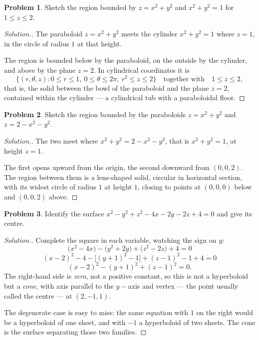 \documentclass[11pt,a4paper]{article}
\theoremstyle{definition}
\newtheorem{problemx}{Problem}[subsection]
\newenvironment{problem}{\begin{problemx}}{\end{problemx}}
\newenvironment{solution}
  {\renewcommand{\qedsymbol}{}\begin{proof}[\textit{Solution}.]}
  {\end{proof}}
\begin{document}
\begin{problem}
Sketch the region bounded by $z = x^2+y^2$ and $x^2+y^2 = 1$ for
$1\leq z\leq 2$.
\end{problem}
\begin{solution}
The paraboloid $z = x^2+y^2$ meets the cylinder $x^2+y^2 = 1$ where $z=1$, in
the circle of radius $1$ at that height.

The region is bounded below by the paraboloid, on the outside by the cylinder,
and above by the plane $z=2$. In cylindrical coordinates it is
$$\big\{(r,\theta,z): 0\leq r\leq 1,\ 0\leq\theta\leq 2\pi,\ r^2\leq z\leq 2\big\}
\quad\text{together with}\quad 1\leq z\leq 2 ,$$
that is, the solid between the bowl of the paraboloid and the plane $z=2$,
contained within the cylinder --- a cylindrical tub with a paraboloidal floor.
\end{solution}

\begin{problem}
Sketch the region bounded by the paraboloids $z = x^2+y^2$ and
$z = 2-x^2-y^2$.
\end{problem}
\begin{solution}
The two meet where $x^2+y^2 = 2-x^2-y^2$, that is $x^2+y^2 = 1$, at height
$z = 1$.

The first opens upward from the origin, the second downward from $(0,0,2)$. The
region between them is a lens-shaped solid, circular in horizontal section, with
its widest circle of radius $1$ at height $1$, closing to points at $(0,0,0)$
below and $(0,0,2)$ above.
\end{solution}

\begin{problem}
Identify the surface $x^2-y^2+z^2-4x-2y-2z+4 = 0$ and give its centre.
\end{problem}
\begin{solution}
Complete the square in each variable, watching the sign on $y$:
$$\big(x^2-4x\big) - \big(y^2+2y\big) + \big(z^2-2z\big) + 4 = 0$$
$$(x-2)^2-4 - \Big[(y+1)^2-1\Big] + (z-1)^2-1 + 4 = 0$$
$$(x-2)^2 - (y+1)^2 + (z-1)^2 = 0 .$$
The right-hand side is \emph{zero}, not a positive constant, so this is not a
hyperboloid but a \emph{cone}, with axis parallel to the $y-$axis and vertex ---
the point usually called the centre --- at $(2,-1,1)$.

The degenerate case is easy to miss: the same equation with $1$ on the right
would be a hyperboloid of one sheet, and with $-1$ a hyperboloid of two sheets.
The cone is the surface separating those two families.
\end{solution}
\end{document}
